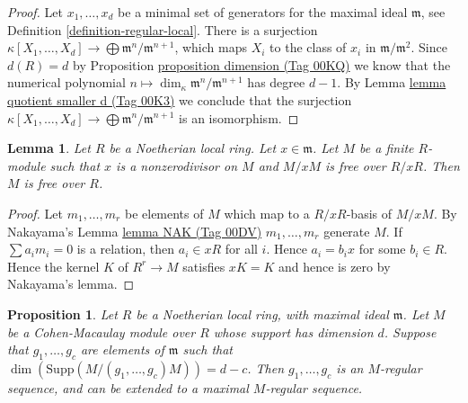 \documentclass{amsart}
\theoremstyle{plain}
\newtheorem{proposition}[subsection]{Proposition}
\newtheorem{lemma}[subsection]{Lemma}
\theoremstyle{definition}
\theoremstyle{remark}
\numberwithin{equation}{subsection}
\begin{document}
\begin{proof}
Let $x_1, \ldots, x_d$ be a minimal set of generators
for the maximal ideal $\mathfrak m$, see
Definition \ref{definition-regular-local}.
There is a surjection $\kappa[X_1, \ldots, X_d]
\to \bigoplus \mathfrak m^n/\mathfrak m^{n + 1}$,
which maps $X_i$ to the class of $x_i$ in $\mathfrak m/\mathfrak m^2$.
Since $d(R) = d$ by
Proposition \href{https://stacks.math.columbia.edu/tag/00KQ}{proposition dimension (Tag 00KQ)}
we know that the numerical
polynomial $n \mapsto \dim_\kappa \mathfrak m^n/\mathfrak m^{n + 1}$
has degree $d - 1$. By Lemma \href{https://stacks.math.columbia.edu/tag/00K3}{lemma quotient smaller d (Tag 00K3)} we
conclude that the surjection $\kappa[X_1, \ldots, X_d]
\to \bigoplus \mathfrak m^n/\mathfrak m^{n + 1}$ is an isomorphism.
\end{proof}


\begin{lemma}
\label{lemma-free-mod-x}
Let $R$ be a Noetherian local ring.
Let $x \in \mathfrak m$.
Let $M$ be a finite $R$-module such that
$x$ is a nonzerodivisor on $M$ and
$M/xM$ is free over $R/xR$.
Then $M$ is free over $R$.
\end{lemma}

\begin{proof}
Let $m_1, \ldots, m_r$ be elements of $M$ which map to
a $R/xR$-basis of $M/xM$. By Nakayama's Lemma \href{https://stacks.math.columbia.edu/tag/00DV}{lemma NAK (Tag 00DV)}
$m_1, \ldots, m_r$ generate $M$. If $\sum a_i m_i = 0$
is a relation, then $a_i \in xR$ for all $i$. Hence
$a_i = b_i x$ for some $b_i \in R$. Hence
the kernel $K$ of $R^r \to M$ satisfies $xK = K$
and hence is zero by Nakayama's lemma.
\end{proof}


\begin{proposition}
\label{proposition-CM-module}
Let $R$ be a Noetherian local ring, with maximal ideal $\mathfrak m$.
Let $M$ be a Cohen-Macaulay module over $R$ whose support has dimension $d$.
Suppose that $g_1, \ldots, g_c$ are elements of
$\mathfrak m$ such that $\dim(\text{Supp}(M/(g_1, \ldots, g_c)M))
= d - c$. Then $g_1, \ldots, g_c$ is an $M$-regular sequence,
and can be extended to a maximal $M$-regular sequence.
\end{proposition}
\end{document}
